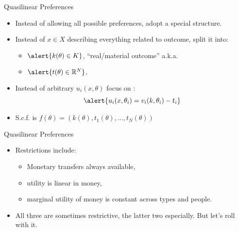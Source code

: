 \documentclass[english,10pt
,aspectratio=169
]{beamer}
\begin{document}
\begin{frame}{Quasilinear Preferences}
\begin{itemize}
	\item Instead of allowing all possible preferences, adopt a special structure.
	\item Instead of $x \in X$ describing everything related to outcome, split it into:
	\begin{itemize}
		\item $\alert{k(\theta) \in K}$, ``real/material outcome'' a.k.a. 
		\item $\alert{t(\theta) \in \mathbb{R}^N}$, 
	\end{itemize}
	\item Instead of arbitrary $u_i(x,\theta)$ focus on :
	$$\alert{ u_i(x,\theta_i) = v_i(k,\theta_i) - t_i }$$
	\vspace{-1em}
	\item S.c.f. is $f(\theta) = \left( k(\theta), t_1(\theta), ..., t_N(\theta) \right)$
\end{itemize}
\end{frame}


\begin{frame}{Quasilinear Preferences}
\begin{itemize}
	\item Restrictions include:
	\begin{itemize}
		\item Monetary transfers always available,
		\item utility is linear in money,
		\item marginal utility of money is constant across types and people.
	\end{itemize}
	\item All three are sometimes restrictive, the latter two especially. But let's roll with it.
\end{itemize}
\end{frame}
\end{document}
